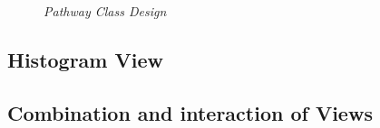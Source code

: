 \begin{figure}[ht]
\centering
{} 
\caption[Pathway Class Design]{\textit{Pathway Class Design}} 
\label{gfx:pathway_class_design}
\end{figure}

\subsection{Histogram View}

\subsection{Combination and interaction of Views}




